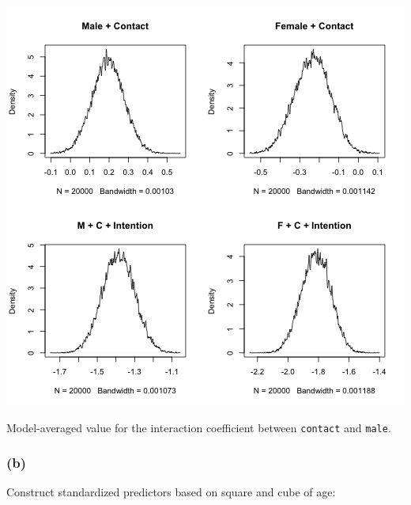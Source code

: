 \documentclass{article}
\makeatletter
\newenvironment{kframe}{%
 \def\FrameCommand##1{\hskip\@totalleftmargin \hskip-\fboxsep
 \colorbox{shadecolor}{##1}\hskip-\fboxsep
     \hskip-\linewidth \hskip-\@totalleftmargin \hskip\columnwidth}%
 \MakeFramed {\advance\hsize-\width
   \@totalleftmargin\z@ \linewidth\hsize
   \@setminipage}}%
 {\par\unskip\endMakeFramed}
\newenvironment{knitrout}{}{} %
\makeatother
\begin{document}
\begin{knitrout}
{\begin{kframe}
\centering{}\includegraphics{interact-coef} 

\end{kframe}}
\end{knitrout}

Model-averaged value for the interaction coefficient between {\tt contact} and {\tt male}. 


\subsubsection*{(b)}


Construct standardized predictors based on square and cube of age: 
\end{document}
